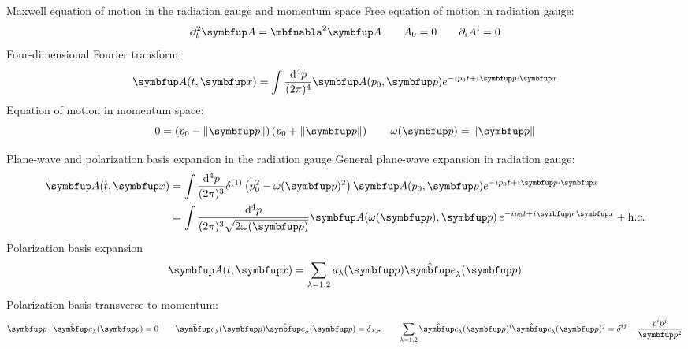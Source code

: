 \documentclass[aspectratio=169,usenames,dvipsnames]{beamer}
\begin{document}
	\appendix
	
	\begin{frame}{Maxwell equation of motion in the radiation gauge and momentum space}
		Free equation of motion in radiation gauge:
		\begin{equation}
			\partial_t^2
			\vb{A}
			=
			\laplace
			\vb{A}
			\qquad
			A_0=0
			\qquad
			\partial_iA^i
			=
			0
		\end{equation}
		Four-dimensional Fourier transform:
		\begin{equation}
			\vb{A}(t,\vb{x})
			=
			\int\frac{\dd[4]{p}}{(2\pi)^4}
			\vb{A}(p_0,\vb{p})
			e^{-ip_0t+i\vb{p}\vdot\vb{x}}
		\end{equation}
		Equation of motion in momentum space:
		\begin{equation}
			0
			=
			\left(p_0-\norm{\vb{p}}\right)
			\left(p_0+\norm{\vb{p}}\right)
			\qquad
			\omega(\vb{p})
			=
			\norm{\vb{p}}
		\end{equation}		
	\end{frame}
	
	\begin{frame}{Plane-wave and polarization basis expansion in the radiation gauge}
		General plane-wave expansion in radiation gauge:
		\begin{equation}
			\begin{split}
				\vb{A}(t,\vb{x})
				&=
				\int\frac{\dd[4]{p}}{(2\pi)^3}
				\delta^{(1)}\left(p_0^2-\omega(\vb{p})^2\right)
				\vb{A}(p_0,\vb{p})
				e^{-ip_0t+i\vb{p}\vdot\vb{x}}
				\\
				&=
				\int\frac{\dd[4]{p}}{(2\pi)^3\sqrt{2\omega(\vb{p})}}
				\vb{A}\!\left(\omega(\vb{p}),\vb{p}\right)
				e^{-ip_0t+i\vb{p}\vdot\vb{x}}
				+
				\text{h.c.}
			\end{split}
		\end{equation}
		Polarization basis expansion
		\begin{equation}
			\vb{A}(t,\vb{x})
			=
			\sum_{\lambda=1,2}
			a_\lambda(\vb{p})
			\vu{e}_\lambda(\vb{p})
		\end{equation}
		Polarization basis transverse to momentum:
		\begin{equation}
			\vb{p}\vdot\vu{e}_\lambda(\vb{p})
			=
			0
			\qquad
			\vu{e}_\lambda(\vb{p})
			\vu{e}_\sigma(\vb{p})
			=
			\delta_{\lambda,\sigma}
			\qquad
			\sum_{\lambda=1,2}
			\vu{e}_\lambda(\vb{p})^i
			\vu{e}_\lambda(\vb{p})^j
			=
			\delta^{ij}
			-
			\frac{p^ip^j}{\vb{p}^2}
		\end{equation}
	\end{frame}
	
\end{document}
